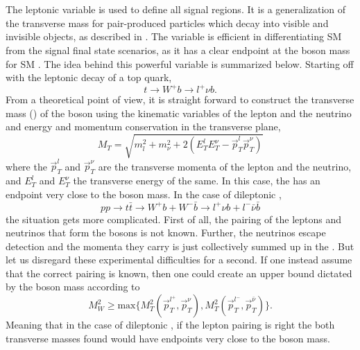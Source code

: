 \section{\mttwo}
\label{sec:MT2}
\noindent\justify
The leptonic \mttwo variable is used to define all signal regions. 
It is a generalization of the transverse mass for pair-produced particles which decay into visible and invisible objects, as described in \cite{Lester:1999tx,Barr_2003}. 
The variable is efficient in differentiating SM \ttbar from the signal final state scenarios, as it has a clear endpoint at the \PW boson mass for SM \ttbar. 
The idea behind this powerful variable is summarized below. 
Starting off with the leptonic decay of a top quark, 
\begin{equation}
t\rightarrow W^{+}b \rightarrow l^{+}\nu b. 
\end{equation}
From a theoretical point of view, it is straight forward to construct the transverse mass (\mT) of the \PW boson using the kinematic variables of the lepton and the neutrino and energy and momentum conservation in the transverse plane,
\begin{equation}
M_{T}=\sqrt{m_{l}^{2}+m_{\nu}^{2}+2(E_{T}^{l}E_{T}^{\nu}-\vec{p}_{T}^{l}\vec{p}_{T}^{\nu})}
\end{equation} 
where the $\vec{p}_{T}^{l}$ and $\vec{p}_{T}^{\nu}$ are the transverse momenta of the lepton and the neutrino, and $E_{T}^{l}$ and $E_{T}^{\nu}$ the transverse energy of the same.
In this case, the \mT has an endpoint very close to the \PW boson mass. 
In the case of dileptonic \ttbar, 
\begin{equation}
pp\rightarrow t\bar{t}\rightarrow W^{+}b + W^{-}\bar{b}\rightarrow l^{+}\nu b +l^{-}\bar{\nu}\bar{b}
\end{equation}
the situation gets more complicated. 
First of all, the pairing of the leptons and neutrinos that form the \PW bosons is not known. 
Further, the neutrinos escape detection and the momenta they carry is just collectively summed up in the \ptmiss. 
But let us disregard these experimental difficulties for a second. 
If one instead assume that the correct pairing is known, then one could create an upper bound dictated by the \PW boson mass according to
\begin{equation}
M_{W}^{2}\geq \mathrm{max}\{M_{T}^{2}\left(\vec{p}_{T}^{l^{+}},\vec{p}_{T}^{\nu}\right), M_{T}^{2}\left(\vec{p}_{T}^{l^{-}},\vec{p}_{T}^{\bar{\nu}}\right)\}.
\end{equation}
Meaning that in the case of dileptonic \ttbar, if the lepton pairing is right the both transverse masses found would have endpoints very close to the \PW boson mass. 
